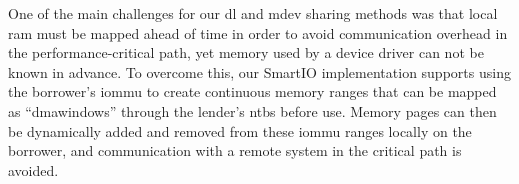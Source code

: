\objperformance*%
%
%
One of the main challenges for our \gls{dl} and \gls{mdev} sharing methods was that local \gls{ram} must be mapped ahead of time in order to avoid communication overhead in the performance-critical path, yet memory used by a device driver can not be known in advance.
%
To overcome this, our SmartIO implementation supports using the \gls{borrower}'s \gls{iommu} to create continuous memory ranges that can be mapped as ``\glspl{dmawindow}'' through the \gls{lender}'s \glspl{ntb} before use.
%
Memory pages can then be dynamically added and removed from these \gls{iommu} ranges locally on the \gls{borrower}, and communication with a remote system in the critical path is avoided.



